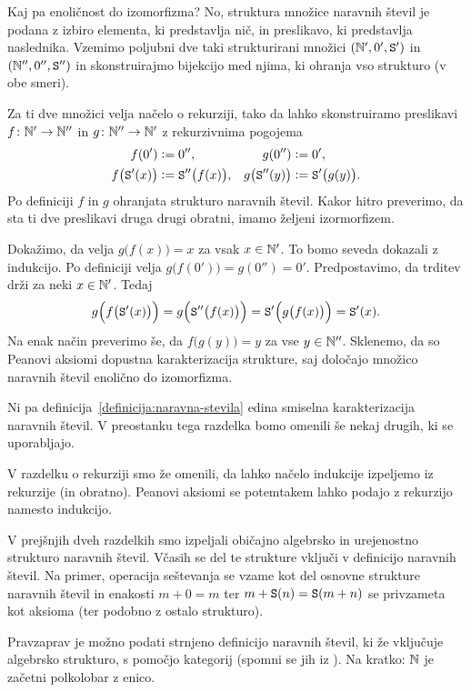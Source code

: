 Kaj pa enoličnost do izomorfizma? No, struktura množice naravnih števil je podana z izbiro elementa, ki predstavlja nič, in preslikavo, ki predstavlja naslednika. Vzemimo poljubni dve taki strukturirani množici $(\mathbb{N}', 0', \mathtt{S}')$ in $(\mathbb{N}'', 0'', \mathtt{S}'')$ in skonstruirajmo bijekcijo med njima, ki ohranja vso strukturo (v obe smeri).

Za ti dve množici velja načelo o rekurziji, tako da lahko skonstruiramo preslikavi $f\colon \mathbb{N}' \to \mathbb{N}''$ in $g\colon \mathbb{N}'' \to \mathbb{N}'$ z rekurzivnima pogojema
\begin{align*}
f(0') &\mathrel{\mathop:}= 0'', & g(0'') &\mathrel{\mathop:}= 0', \\
f\big(\mathtt{S}'(x)\big) &\mathrel{\mathop:}= \mathtt{S}''\big(f(x)\big), & g\big(\mathtt{S}''(y)\big) &\mathrel{\mathop:}= \mathtt{S}'\big(g(y)\big).
\end{align*}
Po definiciji $f$ in $g$ ohranjata strukturo naravnih števil. Kakor hitro preverimo, da sta ti dve preslikavi druga drugi obratni, imamo željeni izormorfizem.

Dokažimo, da velja $g\big(f(x)\big) = x$ za vsak $x \in \mathbb{N}'$. To bomo seveda dokazali z indukcijo. Po definiciji velja $g\big(f(0')\big) = g(0'') = 0'$. Predpostavimo, da trditev drži za neki $x \in \mathbb{N}'$. Tedaj
\[g\Big(f\big(\mathtt{S}'(x)\big)\Big) = g\Big(\mathtt{S}''\big(f(x)\big)\Big) = \mathtt{S}'\Big(g\big(f(x)\big)\Big) = \mathtt{S}'(x).\]
Na enak način preverimo še, da $f\big(g(y)\big) = y$ za vse $y \in \mathbb{N}''$. Sklenemo, da so Peanovi aksiomi dopustna karakterizacija strukture, saj določajo množico naravnih števil enolično do izomorfizma.

Ni pa definicija~\ref{definicija:naravna-stevila} edina smiselna karakterizacija naravnih števil. V preostanku tega razdelka bomo omenili še nekaj drugih, ki se uporabljajo.

V razdelku o rekurziji smo že omenili, da lahko načelo indukcije izpeljemo iz rekurzije (in obratno). Peanovi aksiomi se potemtakem lahko podajo z rekurzijo namesto indukcijo.

V prejšnjih dveh razdelkih smo izpeljali običajno algebrsko in urejenostno strukturo naravnih števil. Včasih se del te strukture vključi v definicijo naravnih števil. Na primer, operacija seštevanja se vzame kot del osnovne strukture naravnih števil in enakosti $m + 0 = m$ ter $m + \mathtt{S}(n) = \mathtt{S}(m + n)$ se privzameta kot aksioma (ter podobno z ostalo strukturo).

Pravzaprav je možno podati strnjeno definicijo naravnih števil, ki že vključuje algebrsko strukturo, s pomočjo kategorij (spomni se jih iz ). Na kratko: $\mathbb{N}$ je začetni polkolobar z enico.


